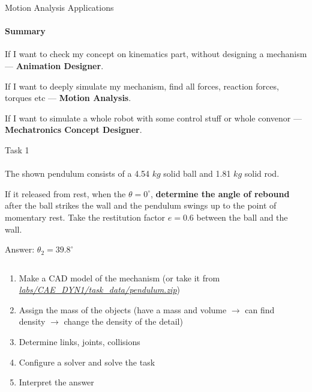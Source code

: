 \documentclass[aspectratio=169]{beamer}
\begin{document}
\begin{frame}[t]{Motion Analysis Applications}
\framesubtitle{Summary}
\Large
\begin{center}
    If I want to check my concept on kinematics part, without designing a mechanism --- \textbf{Animation Designer}. \medskip

    If I want to deeply simulate my mechanism, find all forces, reaction forces, torques etc --- \textbf{Motion Analysis}. \medskip
    
    If I want to simulate a whole robot with some control stuff or whole convenor --- \textbf{Mechatronics Concept Designer}. 
\end{center}
\end{frame}

\begin{frame}[t]{Task 1}
\framesubtitle{}
\footnotesize
    The shown pendulum consists of a 4.54 $kg$ solid ball and 1.81 $kg$ solid rod.

    If it released from rest, when the $\theta = 0^\circ$, \textbf{determine the angle of rebound} after the ball strikes the wall and the pendulum swings up to the point of momentary rest. Take the restitution factor $e=0.6$ between the ball and the wall.
    \smallskip

    \alert{Answer}: $\theta_2 = 39.8^\circ$

    \begin{columns}[T,onlytextwidth]
        \begin{column}{0.49\textwidth}
            \begin{enumerate}
                \footnotesize
                \item Make a CAD model of the mechanism (or take it from \href{https://github.com/Lupasic/MaM_Inno_2023/tree/main/labs/CAE_DYN1/task_data/pendulum.zip}{\textit{labs/CAE\_DYN1/task\_data/pendulum.zip}})
                \item Assign the mass of the objects (have a mass and volume $\rightarrow$ can find density $\rightarrow$ change the density of the detail)
                \item Determine links, joints, collisions
                \item Configure a solver and solve the task
                \item Interpret the answer
            \end{enumerate}
        \end{column}
        \begin{column}{0.49\textwidth}
            \vspace{-1.2cm}


\end{column}
\end{columns}
\end{frame}
\end{document}
